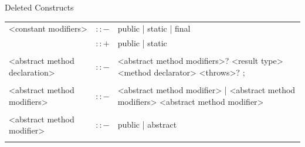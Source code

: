 \documentclass[landscape, 11pt]{article}
\begin{document}
\begin{qsection}{Deleted Constructs}
\begin{enumerate}[label=\bt{\theenumi.}]
\begin{longtable}{R{7cm} c L{15cm}}
				<constant modifiers>						&	$\colon\colon-$	&	public | static | final \\
															&	$\colon\colon+$	&	public | static \\\\
				<abstract method declaration>				&	$\colon\colon-$	&	<abstract method modifiers>? <result type> <method declarator> <throws>? ; \\\\
				<abstract method modifiers>					&	$\colon\colon-$	&	<abstract method modifier> | <abstract method modifiers> <abstract method modifier> \\\\
				<abstract method modifier>					&	$\colon\colon-$	&	public | abstract \\\\
			\end{longtable}



\end{enumerate}
\end{qsection}
\end{document}
